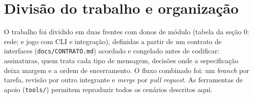 \documentclass[11pt,a4paper]{article}
\begin{document}
\section{Divisão do trabalho e organização}
O trabalho foi dividido em duas frentes com donos de módulo (tabela da seção 0: rede; e jogo com CLI e integração), definidas a partir de um contrato de interfaces (\texttt{docs/CONTRATO.md}) acordado e congelado antes de codificar: assinaturas, quem trata cada tipo de mensagem, decisões onde a especificação deixa margem e a ordem de encerramento. O fluxo combinado foi: um \emph{branch} por tarefa, revisão por outro integrante e \emph{merge} por \emph{pull request}. As ferramentas de apoio (\texttt{tools/}) permitem reproduzir todos os cenários descritos aqui.
\end{document}
